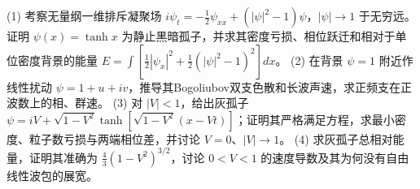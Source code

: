 (1) 考察无量纲一维排斥凝聚场
\(i\psi_t=-\frac12\psi_{xx}+(|\psi|^2-1)\psi\)，\(|\psi|\to1\) 于无穷远。证明 \(\psi(x)=\tanh x\) 为静止黑暗孤子，并求其密度亏损、相位跃迁和相对于单位密度背景的能量
\(E=\int[\frac12|\psi_x|^2+\frac12(|\psi|^2-1)^2]dx\)。
(2) 在背景 \(\psi=1\) 附近作线性扰动 \(\psi=1+u+iv\)，推导其Bogoliubov双支色散和长波声速，求正频支在正波数上的相、群速。
(3) 对 \(|V|<1\)，给出灰孤子
\(\psi=iV+\sqrt{1-V^2}\tanh[\sqrt{1-V^2}(x-Vt)]\)；证明其严格满足方程，求最小密度、粒子数亏损与两端相位差，并讨论 \(V=0\)、\(|V|\to1\)。
(4) 求灰孤子总相对能量，证明其准确为 \(\frac43(1-V^2)^{3/2}\)，讨论 \(0<V<1\) 的速度导数及其为何没有自由线性波包的展宽。
